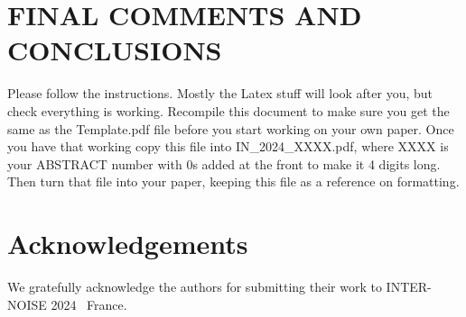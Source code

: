 \documentclass[a4paper,12pt]{article}
\newcommand{\YearConf}{2024}
\begin{document}
\section{FINAL COMMENTS AND CONCLUSIONS}

\noindent
Please follow the instructions.  Mostly the Latex stuff will look after you, but check everything is working. Recompile this document to make sure you get the same as the Template.pdf file before you start working on your own paper.  Once you have that working copy this file into IN\_\YearConf\_XXXX.pdf, where XXXX is your ABSTRACT number with 0s added at the front to make it 4 digits long.   Then turn that file into your paper, keeping this file as a reference on formatting.  

\section*{Acknowledgements}
\noindent
We gratefully acknowledge the authors for submitting their work to INTER-NOISE \YearConf ~ France.


 
\end{document}
